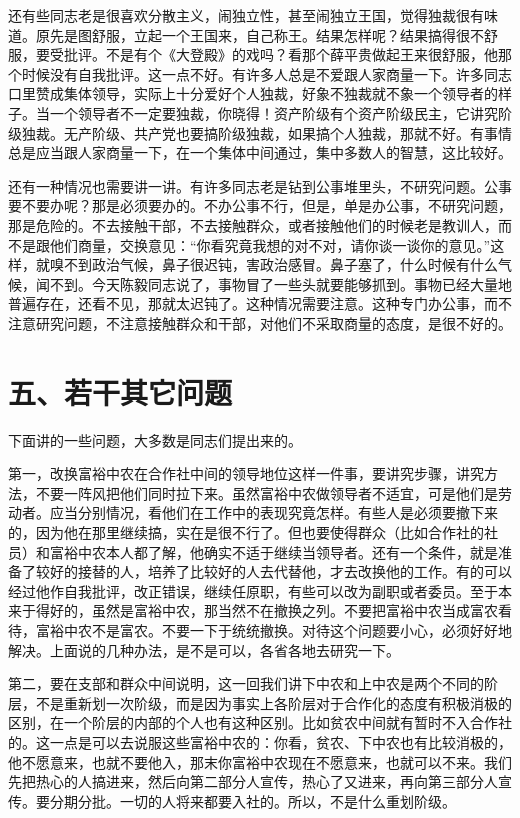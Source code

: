 还有些同志老是很喜欢分散主义，闹独立性，甚至闹独立王国，觉得独裁很有味道。原先是图舒服，立起一个王国来，自己称王。结果怎样呢？结果搞得很不舒服，要受批评。不是有个《大登殿》的戏吗？看那个薛平贵做起王来很舒服，他那个时候没有自我批评。这一点不好。有许多人总是不爱跟人家商量一下。许多同志口里赞成集体领导，实际上十分爱好个人独裁，好象不独裁就不象一个领导者的样子。当一个领导者不一定要独裁，你晓得！资产阶级有个资产阶级民主，它讲究阶级独裁。无产阶级、共产党也要搞阶级独裁，如果搞个人独裁，那就不好。有事情总是应当跟人家商量一下，在一个集体中间通过，集中多数人的智慧，这比较好。

还有一种情况也需要讲一讲。有许多同志老是钻到公事堆里头，不研究问题。公事要不要办呢？那是必须要办的。不办公事不行，但是，单是办公事，不研究问题，那是危险的。不去接触干部，不去接触群众，或者接触他们的时候老是教训人，而不是跟他们商量，交换意见：“你看究竟我想的对不对，请你谈一谈你的意见。”这样，就嗅不到政治气候，鼻子很迟钝，害政治感冒。鼻子塞了，什么时候有什么气候，闻不到。今天陈毅同志说了，事物冒了一些头就要能够抓到。事物已经大量地普遍存在，还看不见，那就太迟钝了。这种情况需要注意。这种专门办公事，而不注意研究问题，不注意接触群众和干部，对他们不采取商量的态度，是很不好的。

\section{五、若干其它问题}

下面讲的一些问题，大多数是同志们提出来的。

第一，改换富裕中农在合作社中间的领导地位这样一件事，要讲究步骤，讲究方法，不要一阵风把他们同时拉下来。虽然富裕中农做领导者不适宜，可是他们是劳动者。应当分别情况，看他们在工作中的表现究竟怎样。有些人是必须要撤下来的，因为他在那里继续搞，实在是很不行了。但也要使得群众（比如合作社的社员）和富裕中农本人都了解，他确实不适于继续当领导者。还有一个条件，就是准备了较好的接替的人，培养了比较好的人去代替他，才去改换他的工作。有的可以经过他作自我批评，改正错误，继续任原职，有些可以改为副职或者委员。至于本来于得好的，虽然是富裕中农，那当然不在撤换之列。不要把富裕中农当成富农看待，富裕中农不是富农。不要一下于统统撤换。对待这个问题要小心，必须好好地解决。上面说的几种办法，是不是可以，各省各地去研究一下。

第二，要在支部和群众中间说明，这一回我们讲下中农和上中农是两个不同的阶层，不是重新划一次阶级，而是因为事实上各阶层对于合作化的态度有积极消极的区别，在一个阶层的内部的个人也有这种区别。比如贫农中间就有暂时不入合作社的。这一点是可以去说服这些富裕中农的：你看，贫农、下中农也有比较消极的，他不愿意来，也就不要他入，那末你富裕中农现在不愿意来，也就可以不来。我们先把热心的人搞进来，然后向第二部分人宣传，热心了又进来，再向第三部分人宣传。要分期分批。一切的人将来都要入社的。所以，不是什么重划阶级。

